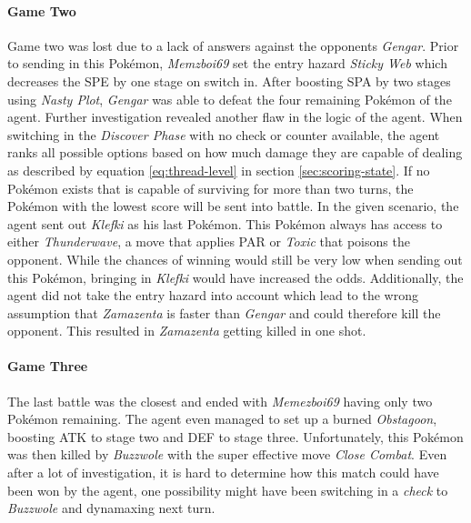 \paragraph{Game Two}
Game two was lost due to a lack of answers against the opponents \textit{Gengar}. Prior to sending in this Pokémon,
\textit{Memzboi69} set the entry hazard \textit{Sticky Web} which decreases the \ac{SPE} by one stage on switch in.
After boosting \ac{SPA} by two stages using \textit{Nasty Plot}, \textit{Gengar} was able to defeat the four 
remaining Pokémon of the agent. Further investigation revealed another flaw in the logic of the agent. When switching
in the \textit{Discover Phase} with no check or counter available, the agent ranks all possible options based on how 
much damage they are capable of dealing as described by equation \ref{eq:thread-level} in section \ref{sec:scoring-state}.
If no Pokémon exists that is capable of surviving for more than two turns, the Pokémon with the lowest score will
be sent into battle. In the given scenario, the agent sent out \textit{Klefki} as his last Pokémon. This Pokémon
always has access to either \textit{Thunderwave}, a move that applies \ac{PAR} or \textit{Toxic} that poisons the
opponent. While the chances of winning would still be very low when sending out this Pokémon, bringing in \textit{Klefki}
would have increased the odds. Additionally, the agent did not take the entry hazard into account which lead to
the wrong assumption that \textit{Zamazenta} is faster than \textit{Gengar} and could therefore kill the opponent.
This resulted in \textit{Zamazenta} getting killed in one shot.

\paragraph{Game Three}
The last battle was the closest and ended with \textit{Memezboi69} having only two Pokémon remaining. The agent
even managed to set up a burned \textit{Obstagoon}, boosting \ac{ATK} to stage two and \ac{DEF} to stage three.
Unfortunately, this Pokémon was then killed by \textit{Buzzwole} with the super effective move \textit{Close Combat}.
Even after a lot of investigation, it is hard to determine how this match could have been won by the agent, one 
possibility might have been switching in a \textit{check} to \textit{Buzzwole} and dynamaxing next turn. 